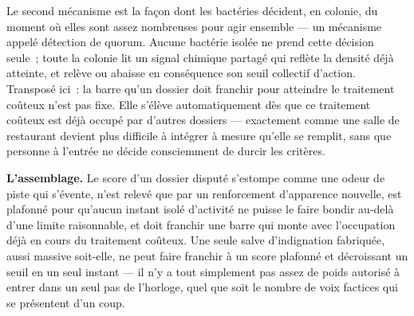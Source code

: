 \documentclass[11pt]{article}
\begin{document}
Le second mécanisme est la façon dont les bactéries décident, en
colonie, du moment où elles sont assez nombreuses pour agir ensemble ---
un mécanisme appelé détection de quorum. Aucune bactérie isolée ne prend
cette décision seule~; toute la colonie lit un signal chimique partagé
qui reflète la densité déjà atteinte, et relève ou abaisse en
conséquence son seuil collectif d'action. Transposé ici~: la barre qu'un
dossier doit franchir pour atteindre le traitement coûteux n'est pas
fixe. Elle s'élève automatiquement dès que ce traitement coûteux est
déjà occupé par d'autres dossiers --- exactement comme une salle de
restaurant devient plus difficile à intégrer à mesure qu'elle se
remplit, sans que personne à l'entrée ne décide consciemment de durcir
les critères.

\textbf{L'assemblage.} Le score d'un dossier disputé s'estompe comme une
odeur de piste qui s'évente, n'est relevé que par un renforcement
d'apparence nouvelle, est plafonné pour qu'aucun instant isolé
d'activité ne puisse le faire bondir au-delà d'une limite raisonnable, et
doit franchir une barre qui monte avec l'occupation déjà en cours du
traitement coûteux. Une seule salve d'indignation fabriquée, aussi
massive soit-elle, ne peut faire franchir à un score plafonné et
décroissant un seuil en un seul instant --- il n'y a tout simplement pas
assez de poids autorisé à entrer dans un seul pas de l'horloge, quel que
soit le nombre de voix factices qui se présentent d'un coup.
\end{document}
